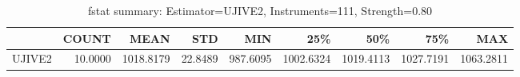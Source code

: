 \begin{table}[ht]
\centering
\caption{fstat summary: Estimator=UJIVE2, Instruments=111, Strength=0.80}
\begin{tabular}{lrrrrrrrr}
\toprule
 & COUNT & MEAN & STD & MIN & 25\% & 50\% & 75\% & MAX \\
\midrule
UJIVE2 & 10.0000 & 1018.8179 & 22.8489 & 987.6095 & 1002.6324 & 1019.4113 & 1027.7191 & 1063.2811 \\
\bottomrule
\end{tabular}
\end{table}
